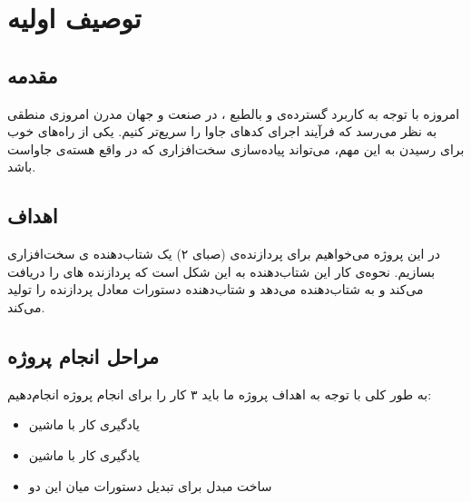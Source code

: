 \section*{توصیف اولیه}
\subsection*{مقدمه}
امروزه با توجه به کاربرد گسترده‌ی
و بالطبع
،
در صنعت و جهان مدرن امروزی منطقی به نظر می‌رسد که فرآیند اجرای کدهای جاوا را سریع‌تر کنیم.
یکی از راه‌های خوب برای رسیدن به این مهم، می‌تواند پیاده‌سازی سخت‌افزاری 
که در واقع هسته‌ی جاواست  باشد.
\subsection*{اهداف}
در این پروژه می‌خواهیم برای پردازنده‌ی 
(صبای ۲)
یک شتاب‌دهنده‌
‌ی سخت‌افزاری
بسازیم.
نحوه‌ی کار این شتاب‌دهنده به این شکل است که پردازنده 
های
را دریافت می‌کند و به شتاب‌دهنده می‌دهد و شتاب‌دهنده دستورات معادل پردازنده را تولید می‌کند.
\subsection*{مراحل انجام پروژه}
به طور کلی با توجه به اهداف پروژه ما باید ۳ کار را برای انجام پروژه انجام‌دهیم:
\begin{itemize}
	\item 
	یادگیری کار با ماشین
	\item
	یادگیری کار با ماشین
	\item
	ساخت مبدل برای تبدیل دستورات میان این دو
\end{itemize}